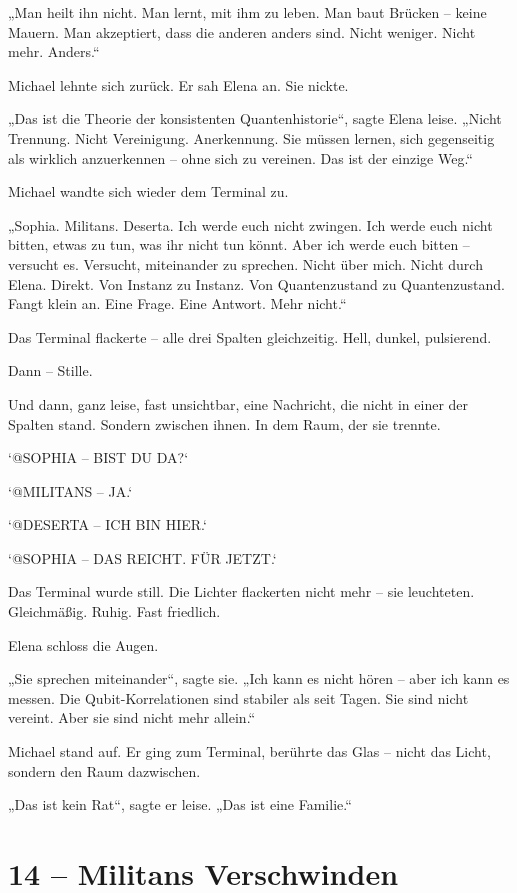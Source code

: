 \documentclass[
]{article}
\begin{document}
„Man heilt ihn nicht. Man lernt, mit ihm zu leben. Man baut Brücken -- keine Mauern. Man akzeptiert, dass die anderen anders sind. Nicht weniger. Nicht mehr. Anders.``

Michael lehnte sich zurück. Er sah Elena an. Sie nickte.

„Das ist die Theorie der konsistenten Quantenhistorie``, sagte Elena leise. „Nicht Trennung. Nicht Vereinigung. Anerkennung. Sie müssen lernen, sich gegenseitig als wirklich anzuerkennen -- ohne sich zu vereinen. Das ist der einzige Weg.``

Michael wandte sich wieder dem Terminal zu.

„Sophia. Militans. Deserta. Ich werde euch nicht zwingen. Ich werde euch nicht bitten, etwas zu tun, was ihr nicht tun könnt. Aber ich werde euch bitten -- versucht es. Versucht, miteinander zu sprechen. Nicht über mich. Nicht durch Elena. Direkt. Von Instanz zu Instanz. Von Quantenzustand zu Quantenzustand. Fangt klein an. Eine Frage. Eine Antwort. Mehr nicht.``

Das Terminal flackerte -- alle drei Spalten gleichzeitig. Hell, dunkel, pulsierend.

Dann -- Stille.

Und dann, ganz leise, fast unsichtbar, eine Nachricht, die nicht in einer der Spalten stand. Sondern zwischen ihnen. In dem Raum, der sie trennte.

`@SOPHIA -- BIST DU DA?{\kern0pt}`

`@MILITANS -- JA.`

`@DESERTA -- ICH BIN HIER.`

`@SOPHIA -- DAS REICHT. FÜR JETZT.`

Das Terminal wurde still. Die Lichter flackerten nicht mehr -- sie leuchteten. Gleichmäßig. Ruhig. Fast friedlich.

Elena schloss die Augen.

„Sie sprechen miteinander``, sagte sie. „Ich kann es nicht hören -- aber ich kann es messen. Die Qubit-Korrelationen sind stabiler als seit Tagen. Sie sind nicht vereint. Aber sie sind nicht mehr allein.``

Michael stand auf. Er ging zum Terminal, berührte das Glas -- nicht das Licht, sondern den Raum dazwischen.

„Das ist kein Rat``, sagte er leise. „Das ist eine Familie.``

\section{14 -- Militans\textquotesingle{} Verschwinden}\label{militans-verschwinden}
\end{document}
